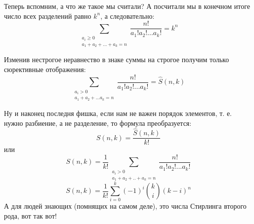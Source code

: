 Теперь вспомним, а что же такое мы считали? А посчитали мы в конечном итоге число всех разделений равно $k^n$, а следовательно:
\begin{equation}
\sum_{\substack{a_i \ge 0 \\ a_1+a_2+...+a_k=n}} \frac{n!}{a_1!a_2!...a_k!} = k^n
\end{equation}

Изменив нестрогое неравнество в знаке суммы на строгое получим только сюрективные отображения:
\begin{equation}
\sum_{\substack{a_i > 0 \\ a_1+a_2+...a_k=n}} \frac{n!}{a_1!a_2!...a_k!} = \hat S \left(n,k\right)
\end{equation}

Ну и наконец последня фишка, если нам не важен порядок элементов, т. е. нужно разбиение, а не разделение, то формула преобразуется:
\begin{equation}
S\left(n,k\right) = \frac{\hat S \left(n,k\right)}{k!}
\end{equation}
или
\begin{equation}
S\left(n,k\right) = \frac{1}{k!} \sum_{\substack{a_i > 0 \\ a_1 + a_2 + .. + a_k = n}} \frac{n!}{a_1!a_2!...a_k!}
\end{equation}
\begin{equation}
S\left(n,k\right) = \frac{1}{k!} \sum_{i=0}^k {\left(-1\right)}^i \binom{k}{i} {\left(k-i\right)}^n
\end{equation}
А для людей знающих (помнящих на самом деле), это числа Стирлинга второго рода, вот так вот!

